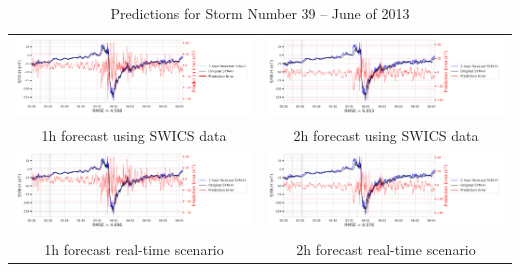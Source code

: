 \documentclass[draft,sw]{agutexSI2019}
\begin{document}
\begin{table}
\centering
\begin{tabular}{cc}
\includegraphics[width=0.49\linewidth]{paper_plots_shade/1h_swics/1h_swics_storm_39.png}
&
\includegraphics[width=0.49\linewidth]{paper_plots_shade/2h_swics/2h_swics_storm_39.png}
\\
1h forecast using SWICS data & 2h forecast using SWICS data
\vspace*{12pt}
\\
\includegraphics[width=0.49\linewidth]{paper_plots_shade/1h_rt/1h_rt_storm_39.png}
&
\includegraphics[width=0.49\linewidth]{paper_plots_shade/2h_rt/2h_rt_storm_39.png}
\\
1h forecast real-time scenario & 2h forecast real-time scenario 
\vspace*{12pt}
\\
\end{tabular}
\caption{Predictions for Storm Number 39 -- June of 2013}
\label{storm-39}
\end{table}
\end{document}
